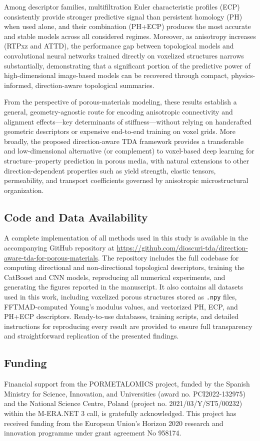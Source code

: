 \documentclass[sn-mathphys,Numbered]{sn-jnl}
\theoremstyle{definition}
\begin{document}
Among descriptor families, multifiltration Euler characteristic profiles (ECP) consistently provide stronger predictive signal than persistent homology (PH) when used alone, and their combination (PH+ECP) produces the most accurate and stable models across all considered regimes. Moreover, as anisotropy increases (RTPxz and ATTD), the performance gap between topological models and convolutional neural networks trained directly on voxelized structures narrows substantially, demonstrating that a significant portion of the predictive power of high-dimensional image-based models can be recovered through compact, physics-informed, direction-aware topological summaries.

From the perspective of porous-materials modeling, these results establish a general, geometry-agnostic route for encoding anisotropic connectivity and alignment effects—key determinants of stiffness—without relying on handcrafted geometric descriptors or expensive end-to-end training on voxel grids. More broadly, the proposed direction-aware TDA framework provides a transferable and low-dimensional alternative (or complement) to voxel-based deep learning for structure–property prediction in porous media, with natural extensions to other direction-dependent properties such as yield strength, elastic tensors, permeability, and transport coefficients governed by anisotropic microstructural organization.

\subsection*{Code and Data Availability}
A complete implementation of all methods used in this study is available in the accompanying GitHub repository at \url{https://github.com/dioscuri-tda/direction-aware-tda-for-porous-materials}. The repository includes the full codebase for computing directional and non-directional topological descriptors, training the CatBoost and CNN models, reproducing all numerical experiments, and generating the figures reported in the manuscript. It also contains all datasets used in this work, including voxelized porous structures stored as \texttt{.npy} files, FFTMAD-computed Young’s modulus values, and vectorized PH, ECP, and PH+ECP descriptors. Ready-to-use databases, training scripts, and detailed instructions for reproducing every result are provided to ensure full transparency and straightforward replication of the presented findings.

\subsection*{Funding}
Financial support from the PORMETALOMICS project, funded by the Spanish
Ministry for Science, Innovation, and Universities (award no.
PCI2022-132975) and the National Science Centre, Poland (project no.
2021/03/Y/ST5/00232) within the M-ERA.NET 3 call, is gratefully acknowledged. 
This project has received funding from the European Union’s Horizon 2020 research and innovation programme under grant agreement No 958174.
\end{document}
